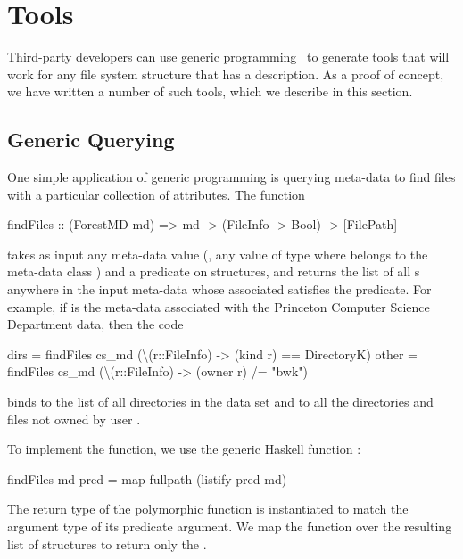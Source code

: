 \section{Tools}
\label{sec:tools}
Third-party developers can use generic programming~\cite{Lammel+:syb} to
generate tools that will work for any file system structure that has a
\forest{} description.  As a proof of concept, we have written a
number of such tools, which we describe in this section.  

\subsection{Generic Querying }
One simple application of generic programming is querying 
meta-data to find files with a particular collection of attributes. 
The  function 
\begin{code}
findFiles :: (ForestMD md) => 
     md -> (FileInfo -> Bool) -> [FilePath]
\end{code}
takes as input any \forest{} meta-data value (\ie{}, any
value of type  where  belongs to the \forest{}
meta-data class ) and a predicate on 
structures, and returns the list of all s anywhere in the
input meta-data whose associated  satisfies the
predicate.  For example, if  is the meta-data associated
with the Princeton Computer Science Department data, then the code 
\begin{code}
dirs  = findFiles cs_md (\textbackslash(r::FileInfo) -> 
                           (kind r) == DirectoryK)
other = findFiles cs_md (\textbackslash(r::FileInfo) -> 
                           (owner r) /= "bwk")
\end{code}
binds  to the list of all directories in the data set and
 to all the directories and files not owned by 
user .

To implement the  function, we use the generic Haskell
function : 
\begin{code}
findFiles md pred = map fullpath (listify pred md)
\end{code}
The return type of the polymorphic  function is
instantiated to match the argument type of its predicate argument. 
We map the  function over the resulting list of
 structures to return only the .

